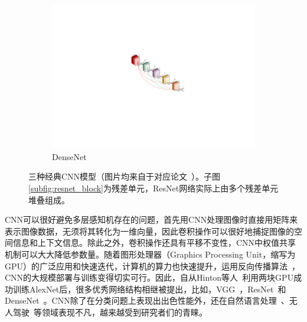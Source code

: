 \begin{figure}[h!]
\begin{subfigure}{0.265\textwidth}
		\includegraphics[width=1.0\textwidth]{figure/popular_networks_densenet}
		\caption{DenseNet~\cite{huang2017densely}}
	\end{subfigure}
	\caption[三种经典CNN模型]{三种经典CNN模型（图片均来自于对应论文~\cite{krizhevsky2012imagenet, he2016deep, huang2017densely}）。子图\ref{subfig:resnet_block}为残差单元，ResNet网络实际上由多个残差单元堆叠组成。} 
	\label{mulfig:popular_networks}
\end{figure}


CNN可以很好避免多层感知机存在的问题，首先用CNN处理图像时直接用矩阵来表示图像数据，无须将其转化为一维向量，因此卷积操作可以很好地捕捉图像的空间信息和上下文信息。除此之外，卷积操作还具有平移不变性，CNN中权值共享机制可以大大降低参数量。随着图形处理器（Graphics Processing Unit，缩写为GPU）的广泛应用和快速迭代，计算机的算力也快速提升，运用反向传播算法~\cite{hecht1992theory}，CNN的大规模部署与训练变得切实可行。因此，自从Hinton等人~\cite{krizhevsky2012imagenet}利用两块GPU成功训练AlexNet后，很多优秀网络结构相继被提出，比如，VGG~\cite{simonyan2014very}，ResNet~\cite{he2016deep, he2016identity}和DenseNet~\cite{huang2017densely}。CNN除了在分类问题上表现出出色性能外，还在自然语言处理~\cite{dos2014deep, mou2016Convolutional}、无人驾驶~\cite{lee2017deep}等领域表现不凡，越来越受到研究者们的青睐。

